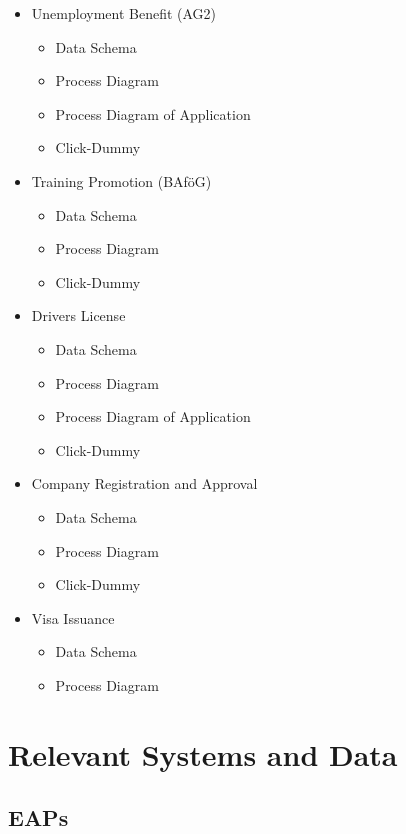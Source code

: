 \documentclass[
     12pt,         %
     a4paper,      %
     BCOR=10mm,version=first,     %
     DIV=14,version=first,        %
     ]{scrreprt}
\begin{document}
\begin{itemize}
     \item Unemployment Benefit (AG2)
\begin{itemize}
     \item Data Schema
     \item Process Diagram
     \item Process Diagram of Application
     \item Click-Dummy
\end{itemize}

\item Training Promotion (BAföG)
\begin{itemize}
     \item Data Schema
     \item Process Diagram
     \item Click-Dummy
\end{itemize}

\item Drivers License
\begin{itemize}
     \item Data Schema
     \item Process Diagram
     \item Process Diagram of Application
     \item Click-Dummy
\end{itemize}

\item Company Registration and Approval
\begin{itemize}
     \item Data Schema
     \item Process Diagram
     \item Click-Dummy
\end{itemize}

\item Visa Issuance
\begin{itemize}
     \item Data Schema
     \item Process Diagram
\end{itemize}


\end{itemize}


\section{Relevant Systems and Data}

\subsection{EAPs}
\end{document}
